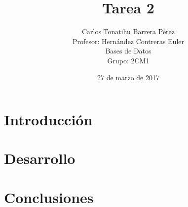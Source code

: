 \documentclass[12pt, titlepage]{article}
\title{Tarea 2}
\author{Carlos Tonatihu Barrera Pérez \\ Profesor: Hernández Contreras Euler \\ Bases de Datos \\ Grupo: 2CM1 }
\date{27 de marzo de 2017}
\begin{document}
	\maketitle
	\tableofcontents
	\section{Introducción}
	\section{Desarrollo}
	\section{Conclusiones}
	
	 
	
\end{document}
